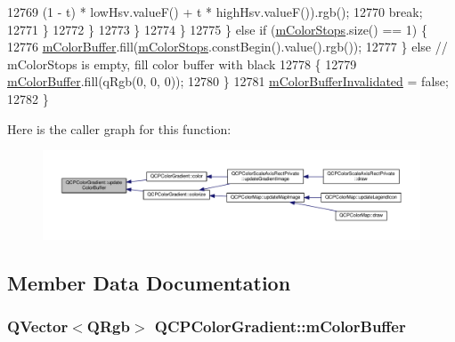 \begin{DoxyCode}
12769                   (1 - t) * lowHsv.valueF() + t * highHsv.valueF()).rgb();
12770           \textcolor{keywordflow}{break};
12771         \}
12772         \}
12773       \}
12774     \}
12775   \} \textcolor{keywordflow}{else} \textcolor{keywordflow}{if} (\hyperlink{class_q_c_p_color_gradient_a9e11a2b0974ef289d12c324822bc3a3e}{mColorStops}.size() == 1) \{
12776     \hyperlink{class_q_c_p_color_gradient_af8b5f0739faa5f8295154d47ce38ecff}{mColorBuffer}.fill(\hyperlink{class_q_c_p_color_gradient_a9e11a2b0974ef289d12c324822bc3a3e}{mColorStops}.constBegin().value().rgb());
12777   \} \textcolor{keywordflow}{else} \textcolor{comment}{// mColorStops is empty, fill color buffer with black}
12778   \{
12779     \hyperlink{class_q_c_p_color_gradient_af8b5f0739faa5f8295154d47ce38ecff}{mColorBuffer}.fill(qRgb(0, 0, 0));
12780   \}
12781   \hyperlink{class_q_c_p_color_gradient_abacf55e11f67d6722a687af1bb2687bd}{mColorBufferInvalidated} = \textcolor{keyword}{false};
12782 \}
\end{DoxyCode}


Here is the caller graph for this function\+:\nopagebreak
\begin{figure}[H]
\begin{center}
\leavevmode
\includegraphics[width=350pt]{class_q_c_p_color_gradient_a353f15ab3ab586eebf1f6b58c3e2707b_icgraph}
\end{center}
\end{figure}




\subsection{Member Data Documentation}
\hypertarget{class_q_c_p_color_gradient_af8b5f0739faa5f8295154d47ce38ecff}{}
\subsubsection[{m\+Color\+Buffer}]{\setlength{\rightskip}{0pt plus 5cm}Q\+Vector$<$Q\+Rgb$>$ Q\+C\+P\+Color\+Gradient\+::m\+Color\+Buffer\hspace{0.3cm}{\ttfamily [protected]}}\label{class_q_c_p_color_gradient_af8b5f0739faa5f8295154d47ce38ecff}


